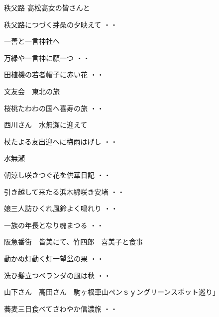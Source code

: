 秩父路 高松高女の皆さんと
\begin{shiika}秩父路につづく芽桑の夕映えて
\hfill{・・}\end{shiika}
\vspace{0.6cm}
一善と一言神社へ
\begin{shiika}万緑や一言神に願一つ
\hfill{・・}\end{shiika}
\begin{shiika}田植機の若者帽子に赤い花
\hfill{・・}\end{shiika}
\vspace{0.6cm}
文友会　東北の旅
\begin{shiika}桜桃たわわの国へ喜寿の旅
\hfill{・・}\end{shiika}
\vspace{0.6cm}
西川さん　水無瀬に迎えて
\begin{shiika}杖たよる友出迎へに梅雨はげし
\hfill{・・}\end{shiika}
\vspace{0.6cm}
水無瀬
\begin{shiika}朝涼し咲きつぐ花を供華日記
\hfill{・・}\end{shiika}
\begin{shiika}引き越して来たる浜木綿咲き安堵
\hfill{・・}\end{shiika}
\begin{shiika}娘三人訪ひくれ風鈴よく鳴れり
\hfill{・・}\end{shiika}
\begin{shiika}一族の年長となり魂まつる
\hfill{・・}\end{shiika}
\vspace{0.6cm}
阪急番街　皆美にて、竹四郎　喜美子と食事
\begin{shiika}動かぬ灯動く灯一望盆の果
\hfill{・・}\end{shiika}
\begin{shiika}洗ひ髪立つベランダの風は秋
\hfill{・・}\end{shiika}
\vspace{0.6cm}
山下さん　高田さん　駒ヶ根車山ペンｓｙングリーンスポット巡り」
\begin{shiika}蕎麦三日食べてさわやか信濃旅
\hfill{・・}\end{shiika}
